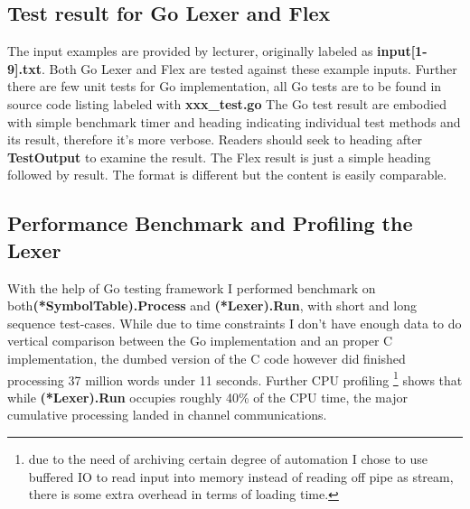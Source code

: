 \documentclass[%
 aip,
 jmp,%
 amsmath,amssymb,
 reprint,%
]{revtex4-1}
\begin{document}
\subsection{Test result for Go Lexer and Flex}
The input examples are provided by lecturer, originally labeled as \textbf{input[1-9].txt}. Both Go Lexer and Flex are tested against these example inputs. Further there are few unit tests for Go implementation, all Go tests are to be found in source code listing labeled with \textbf{xxx\_test.go}
The Go test result are embodied with simple benchmark timer and heading indicating individual test methods and its result, therefore it's more verbose. Readers should seek to heading after \textbf{TestOutput} to examine the result. The Flex result is just a simple heading followed by result. The format is different but the content is easily comparable.

\subsection{Performance Benchmark and Profiling the Lexer}
With the help of Go testing framework I performed benchmark on both\textbf{(*SymbolTable).Process} and \textbf{(*Lexer).Run}, with short and long sequence test-cases. While due to time constraints I don't have enough data to do vertical comparison between the Go implementation and an proper C implementation, the dumbed version of the C code however did finished processing 37 million words under 11 seconds. Further CPU profiling \footnote{due to the need of archiving certain degree of automation I chose to use buffered IO to read input into memory instead of reading off pipe as stream, there is some extra overhead in terms of loading time.} shows that while \textbf{(*Lexer).Run} occupies roughly 40\% of the CPU time, the major cumulative processing landed in channel communications. 
\end{document}
